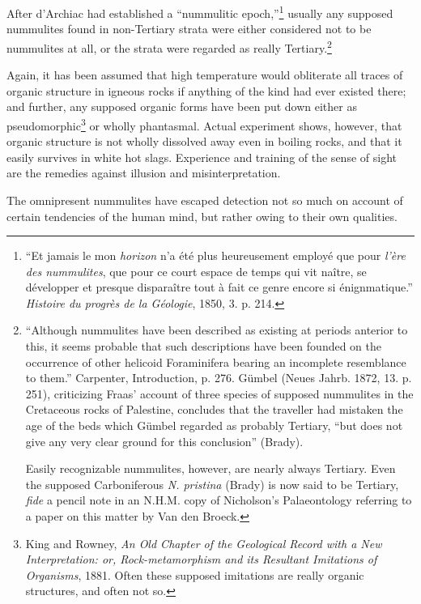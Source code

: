 \documentclass[a4paper, 12pt, oneside, landscape]{article}
\begin{document}
After d'Archiac had established a ``nummulitic epoch,''\footnote{``Et jamais le mon \emph{horizon} n'a été plus heureusement employé que pour \emph{l'ère des nummulites}, que pour ce court espace de temps qui vit naître, se développer et presque disparaître tout à fait ce genre encore si énignmatique.'' \emph{Histoire du progrès de la Géologie}, 1850, 3. p. 214.} usually any supposed nummulites found in non-Tertiary strata were either considered not to be nummulites at all, or the strata were regarded as really Tertiary.\footnote{``Although nummulites have been described as existing at periods anterior to this, it seems probable that such descriptions have been founded on the occurrence of other helicoid Foraminifera bearing an incomplete resemblance to them.'' Carpenter, Introduction, p. 276. Gümbel (Neues Jahrb. 1872, 13. p. 251), criticizing Fraas' account of three species of supposed nummulites in the Cretaceous rocks of Palestine, concludes that the traveller had mistaken the age of the beds which Gümbel regarded as probably Tertiary, ``but does not give any very clear ground for this conclusion'' (Brady).

Easily recognizable nummulites, however, are nearly always Tertiary. Even the supposed Carboniferous \emph{N. pristina} (Brady) is now said to be Tertiary, \emph{fide} a pencil note in an N.H.M. copy of Nicholson's Palaeontology referring to a paper on this matter by Van den Broeck.}

Again, it has been assumed that high temperature would obliterate all traces of organic structure in igneous rocks if anything of the kind had ever existed there; and further, any supposed organic forms have been put down either as pseudomorphic\footnote{King and Rowney, \emph{An Old Chapter of the Geological Record with a New Interpretation: or, Rock-metamorphism and its Resultant Imitations of Organisms}, 1881. Often these supposed imitations are really organic structures, and often not so.} or wholly phantasmal. Actual experiment shows, however, that organic structure is not wholly dissolved away even in boiling rocks, and that it easily survives in white hot slags. Experience and training of the sense of sight are the remedies against illusion and misinterpretation.

The omnipresent nummulites have escaped detection not so much on account of certain tendencies of the human mind, but rather owing to their own qualities.
\end{document}
